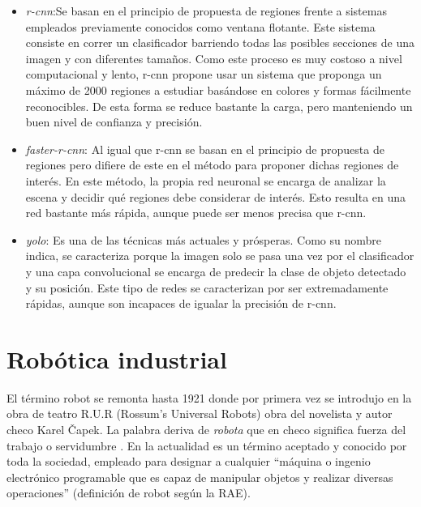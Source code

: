 \begin{itemize}
\begin{itemize}
\item \textit{\ac{r-cnn}}:Se basan en el principio de propuesta de regiones frente a sistemas empleados previamente conocidos como ventana flotante. Este sistema consiste en correr un clasificador barriendo todas las posibles secciones de una imagen y con diferentes tamaños. Como este proceso es muy costoso a nivel computacional y lento, \acs{r-cnn} propone usar un sistema que proponga un máximo de 2000 regiones a estudiar basándose en colores y formas fácilmente reconocibles. De esta forma se reduce bastante la carga, pero manteniendo un buen nivel de confianza y precisión.

\item \textit{\ac{faster-r-cnn}}: Al igual que \acs{r-cnn} se basan en el principio de propuesta de regiones pero difiere de este en el método para proponer dichas regiones de interés. En este método, la propia red neuronal se encarga de analizar la escena y decidir qué regiones debe considerar de interés. Esto resulta en una red bastante más rápida, aunque puede ser menos precisa que \acs{r-cnn}.

\item \textit{\ac{yolo}}: Es una de las técnicas más actuales y prósperas. Como su nombre indica, se caracteriza porque la imagen solo se pasa una vez por el clasificador y una capa convolucional se encarga de predecir la clase de objeto detectado y su posición. Este tipo de redes se caracterizan por ser extremadamente rápidas, aunque son incapaces de igualar la precisión de \acs{r-cnn}.
\end{itemize}
\end{itemize}


\section{Robótica industrial}
\label{chap:Estado de la cuestion sec:Robótica industrial}
El término robot se remonta hasta 1921 donde por primera vez se introdujo en la obra de teatro R.U.R (Rossum’s Universal Robots) obra del novelista y autor checo Karel Čapek. La palabra deriva de \textit{robota} que en checo significa fuerza del trabajo o servidumbre \cite{robotica}. En la actualidad es un término aceptado y conocido por toda la sociedad, empleado para designar a cualquier “máquina o ingenio electrónico programable que es capaz de manipular objetos y realizar diversas operaciones” (definición de robot según la RAE).

